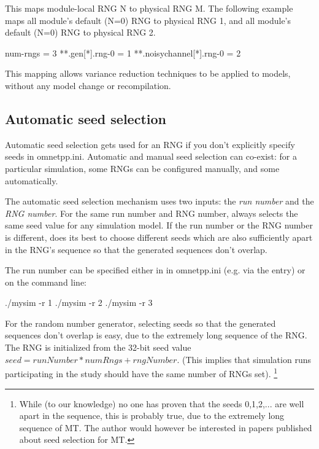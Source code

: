 This maps module-local RNG N to physical RNG M. The following
example maps all   module's default (N=0) RNG to physical RNG 1,
and all   module's default (N=0) RNG to physical RNG 2.

\begin{inifile}
[General]
num-rngs = 3
**.gen[*].rng-0 = 1
**.noisychannel[*].rng-0 = 2
\end{inifile}

This mapping allows variance reduction techniques to be applied to
{\opp} models, without any model change or recompilation.


\subsection{Automatic seed selection}

Automatic seed selection gets used for an RNG if you don't explicitly
specify seeds in omnetpp.ini. Automatic and manual seed selection can
co-exist: for a particular simulation, some RNGs can be configured
manually, and some automatically.

The automatic seed selection mechanism uses two inputs: the \textit{run number}
 and the \textit{RNG number}. For the same run number and RNG number,
{\opp} always selects the same seed value for any simulation model.
If the run number or the RNG number is different, {\opp} does its best
to choose different seeds which are also sufficiently apart in the RNG's sequence
so that the generated sequences don't overlap.

The run number can be specified either in in omnetpp.ini (e.g. via the
 entry) or on the command line:

\begin{commandline}
./mysim -r 1
./mysim -r 2
./mysim -r 3
\end{commandline}

For the  random number generator, selecting seeds
so that the generated sequences don't overlap is easy,
due to the extremely long sequence of the RNG.
The RNG is initialized from the 32-bit seed value $seed = runNumber*numRngs + rngNumber$.
(This implies that simulation runs participating in the study should have
the same number of RNGs set).
    \footnote{While (to our knowledge) no one has proven that the seeds 0,1,2,...
    are well apart in the sequence, this is probably true, due to the extremely
    long sequence of MT. The author would however be interested in papers
    published about seed selection for MT.}

